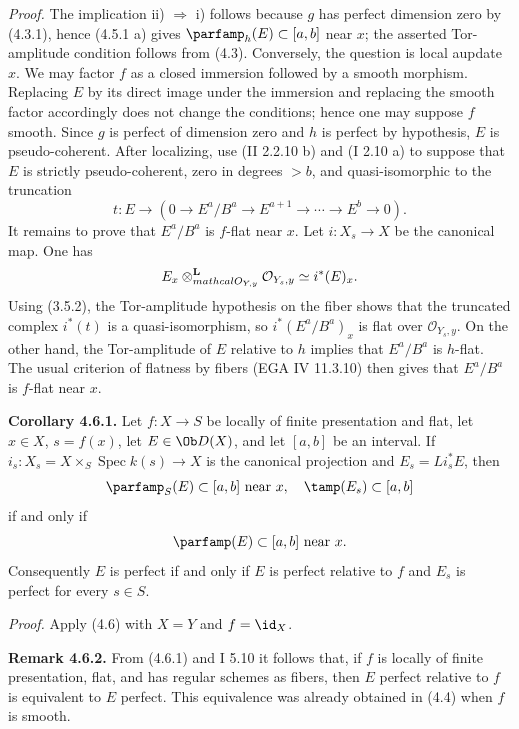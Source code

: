 \documentclass[11pt]{article}
\newcommand{\Spec}{\operatorname{Spec}}
\begin{document}
\emph{Proof.} The implication ii) \(\Rightarrow\) i) follows because \(g\) has perfect dimension zero by (4.3.1), hence (4.5.1 a) gives \(\parfamp_h(E)\subset[a,b]\) near \(x\); the asserted Tor-amplitude condition follows from (4.3). Conversely, the question is local aupdate \(x\). We may factor \(f\) as a closed immersion followed by a smooth morphism. Replacing \(E\) by its direct image under the immersion and replacing the smooth factor accordingly does not change the conditions; hence one may suppose \(f\) smooth. Since \(g\) is perfect of dimension zero and \(h\) is perfect by hypothesis, \(E\) is pseudo-coherent. After localizing, use (II 2.2.10 b) and (I 2.10 a) to suppose that \(E\) is strictly pseudo-coherent, zero in degrees \(>b\), and quasi-isomorphic to the truncation
\[
 t:
 E\longrightarrow
 (0\to E^a/B^a\to E^{a+1}\to\cdots\to E^b\to0).
\]
It remains to prove that \(E^a/B^a\) is \(f\)-flat near \(x\). Let \(i:X_s\to X\) be the canonical map. One has
\[
 E_x\otimes_{\\mathcal O_{Y,y}}^{\mathbf L}\mathcal O_{Y_s,y}
 \simeq i^*(E)_x.
\]
Using (3.5.2), the Tor-amplitude hypothesis on the fiber shows that the truncated complex \(i^*(t)\) is a quasi-isomorphism, so \(i^*(E^a/B^a)_x\) is flat over \(\mathcal O_{Y_s,y}\). On the other hand, the Tor-amplitude of \(E\) relative to \(h\) implies that \(E^a/B^a\) is \(h\)-flat. The usual criterion of flatness by fibers (EGA IV 11.3.10) then gives that \(E^a/B^a\) is \(f\)-flat near \(x\).

\textbf{Corollary 4.6.1.} Let \(f:X\to S\) be locally of finite presentation and flat, let \(x\in X\), \(s=f(x)\), let \(E\in\Ob D(X)\), and let \([a,b]\) be an interval. If \(i_s:X_s=X\times_S\Spec k(s)\to X\) is the canonical projection and \(E_s=Li_s^*E\), then
\[
 \parfamp_S(E)
  \subset[a,b]\text{ near }x,
 \quad
 \tamp(E_s)
  \subset[a,b]
\]
if and only if
\[
 \parfamp(E)
  \subset[a,b]\text{ near }x.
\]
Consequently \(E\) is perfect if and only if \(E\) is perfect relative to \(f\) and \(E_s\) is perfect for every \(s\in S\).

\emph{Proof.} Apply (4.6) with \(X=Y\) and \(f=\id_X\).

\textbf{Remark 4.6.2.} From (4.6.1) and I 5.10 it follows that, if \(f\) is locally of finite presentation, flat, and has regular schemes as fibers, then \(E\) perfect relative to \(f\) is equivalent to \(E\) perfect. This equivalence was already obtained in (4.4) when \(f\) is smooth.
\end{document}
